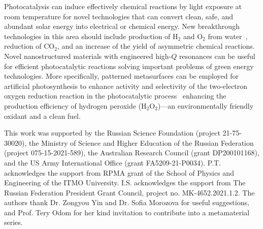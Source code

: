 \documentclass[journal=chreay,manuscript=review]{achemso}
\begin{document}
Photocatalysis can induce effectively chemical reactions by light exposure at room temperature for novel technologies that can convert clean, safe, and abundant solar energy into electrical or chemical energy.  New breakthrough technologies in this area should include production of H$_2$ and O$_2$ from water~\cite{nishiyama_2021}, reduction of CO$_2$, and an increase of the yield of asymmetric chemical reactions. Novel nanostructured materials with engineered high-$Q$ resonances can be useful for efficient photocatalytic reactions solving important problems of green energy technologies. More specifically, patterned metasurfaces can be employed for artificial photosynthesis to enhance activity and selectivity of the two-electron oxygen reduction reaction in the photocatalytic process~\cite{teng_2021} enhancing the production efficiency of hydrogen peroxide (H$_2$O$_2$)—an environmentally friendly oxidant and a clean fuel. 


\begin{acknowledgement}

This work was supported by the Russian Science Foundation (project 21-75-30020), the Ministry of Science and Higher Education of the Russian Federation (project 075-15-2021-589), the Australian Research Council (grant DP200101168), and the US Army International Office (grant FA5209-21-P0034). P.T. acknowledges the support from RPMA grant of the School of Physics and Engineering of the ITMO University. I.S. acknowledges the support from The Russian Federation President Grant Council, project no. MK-4652.2021.1.2. The authors thank Dr. Zongyou Yin and Dr. Sofia Morozova for useful suggestions, and Prof. Tery Odom for her kind invitation to contribute into a metamaterial series. 

\end{acknowledgement}


\newpage 





%

\end{document}

